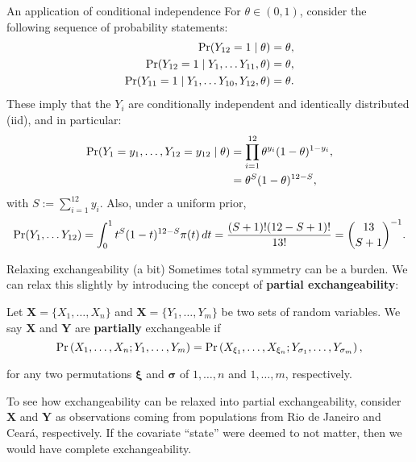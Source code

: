 \begin{frame}{An application of conditional independence}
For $\theta \in (0, 1)$, consider the following sequence of probability statements:
\begin{align*}
\operatorname{Pr}(Y_{12} = 1 \mid \theta) &= \theta,\\
\operatorname{Pr}(Y_{12} = 1 \mid Y_1, \ldots Y_{11}, \theta) & = \theta,\\
\operatorname{Pr}(Y_{11} = 1 \mid Y_1, \ldots Y_{10}, Y_{12}, \theta) &= \theta.
\end{align*}
These imply that the $Y_i$ are conditionally independent and identically distributed (iid), and in particular:
\begin{align*}
 \operatorname{Pr}(Y_1 = y_1, \ldots, Y_{12} = y_{12} \mid \theta) &= \prod_{i=1}^{12} \theta^{y_i} (1-\theta)^{1-y_i},\\
 &= \theta^{S} (1-\theta)^{12-S},
\end{align*}
with $S := \sum_{i=1}^{12} y_i$.
Also, under a uniform prior, 
$$ \operatorname{Pr}(Y_1, \ldots Y_{12}) = \int_{0}^1 t^{S} (1-t)^{12-S} \pi(t)\,dt = \frac{(S + 1)!(12-S +1)!}{13!} = \binom{13}{S + 1}^{-1}.$$
\end{frame}
\begin{frame}{Relaxing exchangeability (a bit)}
 Sometimes total symmetry can be a burden. 
 We can relax this slightly by introducing the concept of \textbf{partial exchangeability}:
 \begin{defn}
  \label{def:partially_exchangeable}
  Let $\boldsymbol{X} = \{ X_1, \ldots, X_n\}$ and $\boldsymbol{X} = \{ Y_1, \ldots, Y_m\}$ be two sets of random variables.
  We say $\boldsymbol{X}$ and $\boldsymbol{Y}$ are \textbf{partially} exchangeable if
  $$ \operatorname{Pr}\left(X_1, \ldots, X_n ; Y_1, \ldots, Y_m\right) = \operatorname{Pr}\left(X_{\xi_1}, \ldots, X_{\xi_n} ; Y_{\sigma_1}, \ldots, Y_{\sigma_m}\right),$$
 \end{defn}
 for any two permutations $\boldsymbol{\xi}$ and $\boldsymbol{\sigma}$ of $1, \ldots, n$ and $1, \ldots, m$, respectively.
 \begin{example}
  To see how exchangeability can be relaxed into partial exchangeability, consider $\boldsymbol{X}$ and $\boldsymbol{Y}$ as observations coming from populations from Rio de Janeiro and Ceará, respectively.
  If the covariate ``state'' were deemed to not matter, then we would have complete exchangeability.
 \end{example}
\end{frame}
